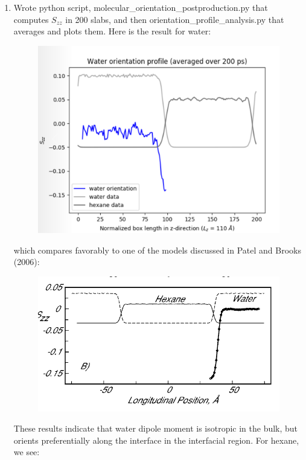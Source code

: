 \documentclass[12pt,reqno]{amsart}
\numberwithin{equation}{section}
\begin{document}
\begin{enumerate}
\item Wrote python script, molecular\_orientation\_postproduction.py that computes $S_{zz}$ in 200 slabs, and then orientation\_profile\_analysis.py that averages and plots them.  Here is the result for water:

\begin{figure}[H]
\centering
\includegraphics[scale=0.4]{water_orientation}
\end{figure}

which compares favorably to one of the models discussed in Patel and Brooks (2006):
\begin{figure}[H]
\centering
\includegraphics[scale=0.4]{patel_water_orientation}
\end{figure}

These results indicate that water dipole moment is isotropic in the bulk, but orients preferentially along the interface in the interfacial region.  For hexane, we see:


\end{enumerate}
\end{document}
